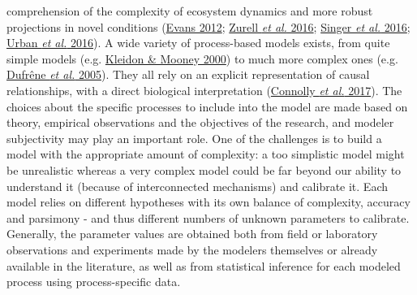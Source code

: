 \documentclass[11pt,]{article}
\begin{document}
comprehension of the complexity of ecosystem dynamics and more robust
projections in novel conditions (\protect\hyperlink{ref-Evans2012}{Evans
2012}; \protect\hyperlink{ref-Zurell2016}{Zurell \emph{et al.} 2016};
\protect\hyperlink{ref-Singer2016}{Singer \emph{et al.} 2016};
\protect\hyperlink{ref-Urban2016}{Urban \emph{et al.} 2016}). A wide
variety of process-based models exists, from quite simple models (e.g.
\protect\hyperlink{ref-Kleidon2000}{Kleidon \& Mooney 2000}) to much
more complex ones (e.g. \protect\hyperlink{ref-Dufrene2005}{Dufrêne
\emph{et al.} 2005}). They all rely on an explicit representation of
causal relationships, with a direct biological interpretation
(\protect\hyperlink{ref-Connolly2017}{Connolly \emph{et al.} 2017}). The
choices about the specific processes to include into the model are made
based on theory, empirical observations and the objectives of the
research, and modeler subjectivity may play an important role. One of
the challenges is to build a model with the appropriate amount of
complexity: a too simplistic model might be unrealistic whereas a very
complex model could be far beyond our ability to understand it (because
of interconnected mechanisms) and calibrate it. Each model relies on
different hypotheses with its own balance of complexity, accuracy and
parsimony - and thus different numbers of unknown parameters to
calibrate. Generally, the parameter values are obtained both from field
or laboratory observations and experiments made by the modelers
themselves or already available in the literature, as well as from
statistical inference for each modeled process using process-specific
data.
\end{document}
